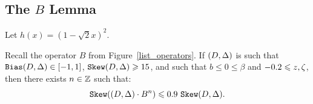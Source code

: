 \subsection[The B Lemma]{The $B$ Lemma}
\label{ssect-B}

\begin{definition}
  Let $h(x)=(1-\sqrt{2}x)^2$.
\end{definition}

\begin{lemma}
\label{lemmaB}
Recall the operator $B$ from Figure~\ref{list_operators}. 
If $(D,\Delta) $ is such that $\mathtt{Bias}(D,\Delta)\in 
[-1,1]$, $\sk\state\geq\formula{\P}$, and such that $b\leq 0\leq\beta$ 
and $\formula{-\b}\leq z,\zeta$, then 
there exists $n\in\mathbb{Z}$ such that:
\[
  \sk(\state\cdot B^n) \leq \formula{\Qstep}~\sk\state.
\]
\end{lemma}

